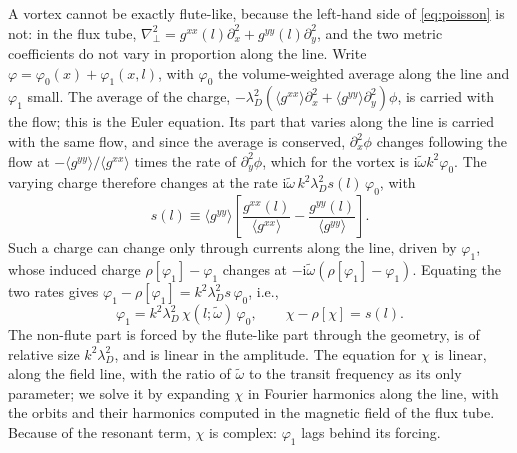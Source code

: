 \documentclass{jpp}
\newcommand{\lambdaD}{\lambda_D}
\newcommand{\rmi}{\text{i}}
\newcommand{\wt}{\tilde\omega}
\begin{document}
A vortex cannot be exactly flute-like, because the left-hand side of \cref{eq:poisson} is not: in the flux tube, \(\nabla_\perp^2 = g^{xx}(l)\partial_x^2 + g^{yy}(l)\partial_y^2\), and the two metric coefficients do not vary in proportion along the line. Write \(\varphi = \varphi_0(x) + \varphi_1(x,l)\), with \(\varphi_0\) the volume-weighted average along the line and \(\varphi_1\) small. The average of the charge, \(-\lambdaD^2(\langle g^{xx}\rangle\partial_x^2 + \langle g^{yy}\rangle\partial_y^2)\phi\), is carried with the flow; this is the Euler equation. Its part that varies along the line is carried with the same flow, and since the average is conserved, \(\partial_x^2\phi\) changes following the flow at \(-\langle g^{yy}\rangle/\langle g^{xx}\rangle\) times the rate of \(\partial_y^2\phi\), which for the vortex is \(\rmi\wt k^2\varphi_0\). The varying charge therefore changes at the rate \(\rmi\wt\,k^2\lambdaD^2 s(l)\,\varphi_0\), with
\begin{equation}
s(l) \equiv \langle g^{yy}\rangle\left[\frac{g^{xx}(l)}{\langle g^{xx}\rangle} - \frac{g^{yy}(l)}{\langle g^{yy}\rangle}\right].
\label{eq:Hsource}
\end{equation}
Such a charge can change only through currents along the line, driven by \(\varphi_1\), whose induced charge \(\rho[\varphi_1] - \varphi_1\) changes at \(-\rmi\wt(\rho[\varphi_1] - \varphi_1)\). Equating the two rates gives \(\varphi_1 - \rho[\varphi_1] = k^2\lambdaD^2 s\,\varphi_0\), i.e.,
\begin{equation}
\varphi_1 = k^2\lambdaD^2\,\chi(l;\wt)\,\varphi_0,
\qquad
\chi - \rho[\chi] = s(l).
\label{eq:Hchi}
\end{equation}
The non-flute part is forced by the flute-like part through the geometry, is of relative size \(k^2\lambdaD^2\), and is linear in the amplitude. The equation for \(\chi\) is linear, along the field line, with the ratio of \(\wt\) to the transit frequency as its only parameter; we solve it by expanding \(\chi\) in Fourier harmonics along the line, with the orbits and their harmonics computed in the magnetic field of the flux tube. Because of the resonant term, \(\chi\) is complex: \(\varphi_1\) lags behind its forcing.
\end{document}
